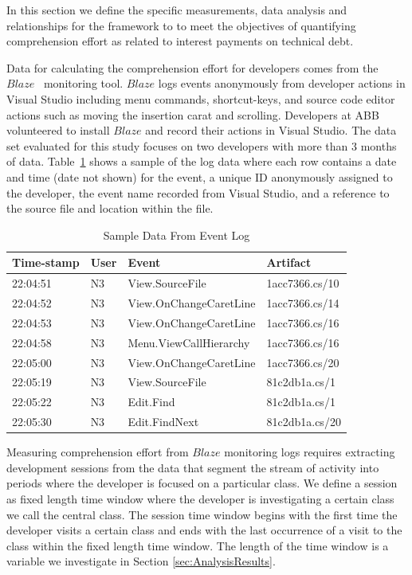 In this section we define the specific measurements, data analysis and relationships for the framework to to meet the objectives of quantifying comprehension effort as related to interest payments on technical debt.

Data for calculating the comprehension effort for developers comes from the $Blaze$~\cite{Snipes_etal:2014} monitoring tool.  $Blaze$ logs events anonymously from developer actions in Visual Studio including menu commands, shortcut-keys, and source code editor actions such as moving the insertion carat and scrolling.  Developers at ABB volunteered to install $Blaze$ and record their actions in Visual Studio.  The data set evaluated for this study focuses on two developers with more than 3 months of data.  Table~\ref{fig:SampleEventData} shows a sample of the log data where each row contains a date and time (date not shown) for the event, a unique ID anonymously assigned to the developer, the event name recorded from Visual Studio, and a reference to the source file and location within the file.

\begin{table}
	\centering
	\caption{Sample Data From Event Log}
	\begin{tabular}{|l|l|l|l|}
	\hline

Time-stamp & User & Event & Artifact \\
\hline\hline
22:04:51 & N3 & View.SourceFile & 1acc7366.cs/10 \\
\hline
22:04:52 & N3 & View.OnChangeCaretLine & 1acc7366.cs/14 \\
\hline
22:04:53 & N3 & View.OnChangeCaretLine & 1acc7366.cs/16 \\
\hline
22:04:58 & N3 & Menu.ViewCallHierarchy & 1acc7366.cs/16 \\
\hline
22:05:00 & N3 & View.OnChangeCaretLine & 1acc7366.cs/20 \\
\hline
22:05:19 & N3 & View.SourceFile & 81c2db1a.cs/1 \\
\hline
22:05:22 & N3 & Edit.Find & 81c2db1a.cs/1 \\
\hline
22:05:30 & N3 & Edit.FindNext & 81c2db1a.cs/20 \\
\hline

	\end{tabular}
	\label{fig:SampleEventData}
\end{table}

Measuring comprehension effort from $Blaze$ monitoring logs requires extracting development sessions from the data that segment the stream of activity into periods where the developer is focused on a particular class.  We define a session as fixed length time window where the developer is investigating a certain class we call the central class.  The session time window begins with the first time the developer visits a certain class and ends with the last occurrence of a visit to the class within the fixed length time window.  The length of the time window is a variable we investigate in Section \ref{sec:AnalysisResults}.  

